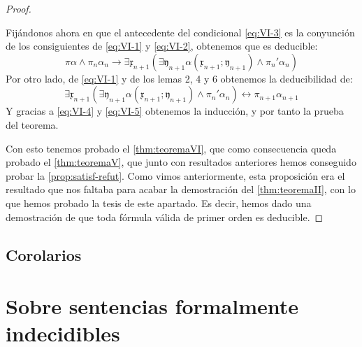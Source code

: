 \begin{proof}
\begin{itemize}
                Fijándonos ahora en que el antecedente del condicional \eqref{eq:VI-3} es la conyunción de los consiguientes de \eqref{eq:VI-1} y \eqref{eq:VI-2},
                obtenemos que es deducible:
                \begin{equation} \label{eq:VI-4}
                    \pi\alpha \wedge \pi_n\alpha_n \rightarrow \exists \mathfrak{x}_{n+1} (\exists \mathfrak{y}_{n+1} 
                    \alpha (\mathfrak{x}_{n+1} ; \mathfrak{y}_{n+1} ) \wedge \pi_n'\alpha_n)
                \end{equation}
                Por otro lado, de \eqref{eq:VI-1} y de los lemas 2, 4 y 6 obtenemos la deducibilidad de:
                \begin{equation} \label{eq:VI-5}
                    \exists \mathfrak{x}_{n+1} (\exists \mathfrak{y}_{n+1} \alpha (\mathfrak{x}_{n+1} ; \mathfrak{y}_{n+1} ) \wedge \pi_n'\alpha_n)
                    \leftrightarrow \pi_{n+1}\alpha_{n+1}
                \end{equation}
                Y gracias a \eqref{eq:VI-4} y \eqref{eq:VI-5} obtenemos la inducción, y por tanto la prueba del teorema.
    \end{itemize}

    Con esto tenemos probado el \autoref{thm:teoremaVI}, que como consecuencia queda probado el \autoref{thm:teoremaV}, que junto con resultados anteriores hemos conseguido 
    probar la \autoref{prop:satisf-refut}. Como vimos anteriormente, esta proposición era el resultado que nos faltaba para acabar la demostración del \autoref{thm:teoremaII}, 
    con lo que hemos probado la tesis de este apartado. Es decir, hemos dado una demostración de que toda fórmula válida de primer orden es deducible.
\end{proof}


\section{Corolarios}




\chapter{Sobre sentencias formalmente indecidibles}


